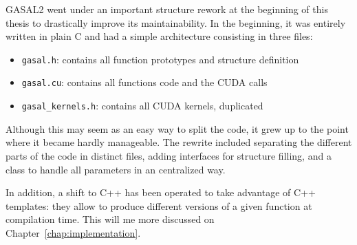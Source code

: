 GASAL2 went under an important structure rework at the beginning of this thesis to drastically improve its maintainability. In the beginning, it was entirely written in plain C and had a simple architecture consisting in three files:

\begin{itemize}
	\item \verb|gasal.h|: contains all function prototypes and structure definition
	\item \verb|gasal.cu|: contains all functions code and the CUDA calls
	\item \verb|gasal_kernels.h|: contains all CUDA kernels, duplicated
\end{itemize}

Although this may seem as an easy way to split the code, it grew up to the point where it became hardly manageable. The rewrite included separating the different parts of the code in distinct files, adding interfaces for structure filling, and a class to  handle all parameters in an centralized way.

In addition, a shift to C++ has been operated to take advantage of C++ templates: they allow to produce different versions of a given function at compilation time. This will me more discussed on Chapter~\ref{chap:implementation}.




